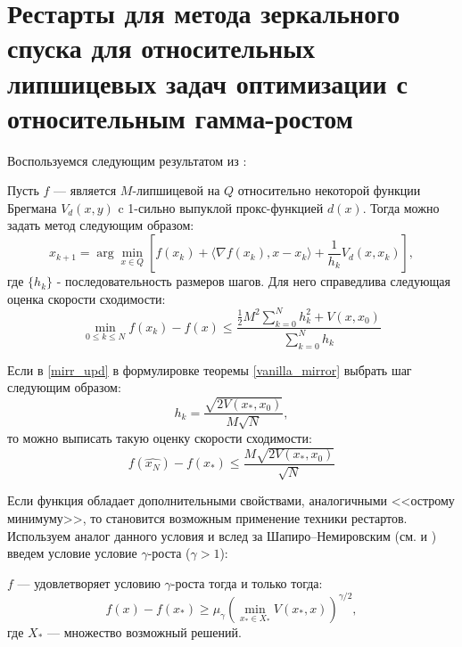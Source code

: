 \section{Рестарты для метода зеркального спуска для относительных липшицевых задач оптимизации с относительным гамма-ростом}\label{sec:ch3/sect3}
    Воспользуемся следующим результатом из \cite{Lu_2018}:
    \begin{theorem} \label{vanilla_mirror}
        Пусть $f$ --- является $M$-липшицевой на $Q$ относительно некоторой функции Брегмана $V_d(x, y)$ c 1-сильно выпуклой прокс-функцией $d(x)$. Тогда можно задать метод следующим образом:
        \begin{equation} \label{mirr_upd}
            x_{k+1} = \arg \min_{x \in Q} {\left[ f(x_k) + \langle \nabla f(x_k), x - x_k \rangle + \frac{1}{h_k} V_d(x, x_k)\right]},
        \end{equation}
        где $\{ h_k \}$ - последовательность размеров шагов.
        Для него справедлива следующая оценка скорости сходимости:
        \begin{equation} \label{general_est}
            \min_{0\leq k \leq N} f(x_k) - f(x) \leq \frac{\frac{1}{2} M^2 \sum_{k=0}^N h_k^2 + V(x, x_0)}{\sum_{k=0}^N h_k}
        \end{equation}
    \end{theorem}

    \begin{remark}
        Если в \eqref{mirr_upd} в формулировке теоремы \ref{vanilla_mirror} выбрать шаг следующим образом:
        \begin{equation} \label{mirr_step}
            h_{k} = \frac{\sqrt{2 V(x_*, x_0)}}{M\sqrt{N}},
        \end{equation}
        то можно выписать такую оценку скорости сходимости:
        \begin{equation} \label{mirr_est}
            f(\widehat{x_N}) - f(x_*) \leq \frac{M\sqrt{2V(x_*, x_0)}}{\sqrt{N}}
        \end{equation}
    \end{remark}
    Если функция обладает дополнительными свойствами, аналогичными <<острому минимуму>>,  то становится возможным применение техники рестартов. Используем аналог данного условия и вслед за Шапиро–Немировским (см. \cite{shapiro_2005} и \cite{shapiro_2021} ) введем  условие условие $\gamma$-роста ($\gamma > 1$):
    \begin{definition}
       $f$ --- удовлетворяет условию $\gamma$-роста тогда и только тогда:
       \begin{equation} \label{gamma-growth}
           f(x) - f(x_*) \geq \mu_{\gamma}\left(\min_{x_* \in X_*}{V(x_*,x)}\right)^{\gamma/2},
       \end{equation}
       где $X_*$ --- множество возможный решений.  
    \end{definition}
    
